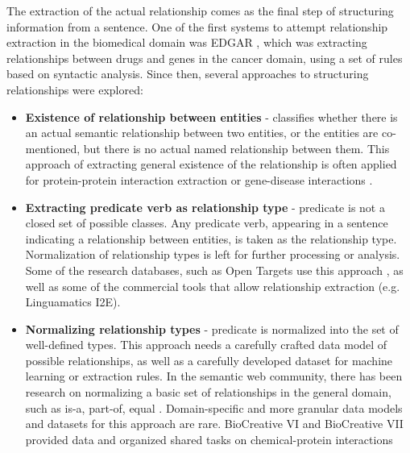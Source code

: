 \documentclass[final,12pt,3p,times,twocolumn,authoryear]{elsarticle}
\begin{document}
The extraction of the actual relationship comes as the final step of structuring information from a sentence. One of the first systems to attempt relationship extraction in the biomedical domain was EDGAR \citep{rindflesch1999edgar}, which was extracting relationships between drugs and genes in the cancer domain, using a set of rules based on syntactic analysis. Since then, several approaches to structuring relationships were explored: 
\begin{itemize}
    \item \textbf{Existence of relationship between entities} - classifies whether there is an actual semantic relationship between two entities, or the entities are co-mentioned, but there is no actual named relationship between them. This approach of extracting general existence of the relationship is often applied for protein-protein interaction extraction \citep{zitnik2018modeling,szklarczyk2019string} or gene-disease interactions \citep{becker2004genetic}.
    \item \textbf{Extracting predicate verb as relationship type} - predicate is not a closed set of possible classes. Any predicate verb, appearing in a sentence indicating a relationship between entities, is taken as the relationship type. Normalization of relationship types is left for further processing or analysis. Some of the research databases, such as Open Targets use this approach \citep{carvalho2019open}, as well as some of the commercial tools that allow relationship extraction (e.g. Linguamatics I2E). 
    \item \textbf{Normalizing relationship types} - predicate is normalized into the set of well-defined types. This approach needs a carefully crafted data model of possible relationships, as well as a carefully developed dataset for machine learning or extraction rules. In the semantic web community, there has been research on normalizing a basic set of relationships in the general domain, such as is-a, part-of, equal \citep{arnold2015semrep,speer2013conceptnet,speer2017conceptnet}. Domain-specific and more granular data models and datasets for this approach are rare. BioCreative VI and BioCreative VII provided data and organized shared tasks on chemical-protein interactions \citep{krallinger2017overview,krallingerdrugprot}
\end{itemize}
\end{document}
